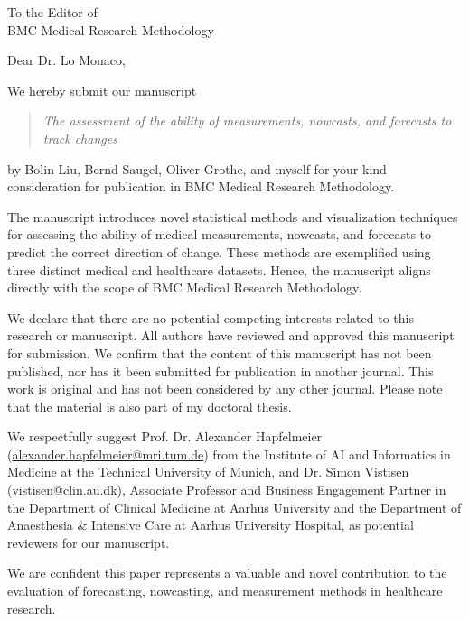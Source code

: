 \documentclass[%
 KITletter, %
fromemail,fromurl, %
 USenglish,%
  backaddress=off,
foldmarks=off,
 ]{scrlttr2}
\begin{document}

\def\pagename{} %

\begin{letter}{%
To the Editor of \\ BMC Medical Research Methodology
}

\opening{Dear Dr. Lo Monaco,}

We hereby submit our manuscript

\begin{quote}
\textit{The assessment of the ability of measurements, nowcasts, and forecasts to track changes}
\end{quote}

by Bolin Liu, Bernd Saugel, Oliver Grothe, and myself for your kind consideration for publication in BMC Medical Research Methodology.

The manuscript introduces novel statistical methods and visualization techniques for assessing the ability of medical measurements, nowcasts, and forecasts to predict the correct direction of change.
These methods are exemplified using three distinct medical and healthcare datasets.
Hence, the manuscript aligns directly with the scope of BMC Medical Research Methodology.

We declare that there are no potential competing interests related to this research or manuscript.
All authors have reviewed and approved this manuscript for submission.
We confirm that the content of this manuscript has not been published, nor has it been submitted for publication in another journal.
This work is original and has not been considered by any other journal.
Please note that the material is also part of my doctoral thesis.

We respectfully suggest Prof. Dr. Alexander Hapfelmeier (\url{alexander.hapfelmeier@mri.tum.de}) from the Institute of AI and Informatics in Medicine at the Technical University of Munich, and Dr. Simon Vistisen (\url{vistisen@clin.au.dk}), Associate Professor and Business Engagement Partner in the Department of Clinical Medicine at Aarhus University and the Department of Anaesthesia \& Intensive Care at Aarhus University Hospital, as potential reviewers for our manuscript.

We are confident this paper represents a valuable and novel contribution to the evaluation of forecasting, nowcasting, and measurement methods in healthcare research.


\closing{}

\end{letter}
\end{document}
